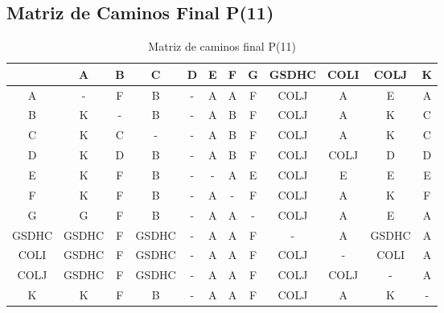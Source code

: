 \documentclass[12pt]{article}
\begin{document}
\subsection{Matriz de Caminos Final P(11)}
\begin{table}[h!]
\centering
\begin{tabular}{|c|c|c|c|c|c|c|c|c|c|c|c|}
\hline
 & A & B & C & D & E & F & G & GSDHC & COLI & COLJ & K \\\hline
A & - & F & B & - & A & A & F & COLJ & A & E & A \\\hline
B & K & - & B & - & A & B & F & COLJ & A & K & C \\\hline
C & K & C & - & - & A & B & F & COLJ & A & K & C \\\hline
D & K & D & B & - & A & B & F & COLJ & COLJ & D & D \\\hline
E & K & F & B & - & - & A & E & COLJ & E & E & E \\\hline
F & K & F & B & - & A & - & F & COLJ & A & K & F \\\hline
G & G & F & B & - & A & A & - & COLJ & A & E & A \\\hline
GSDHC & GSDHC & F & GSDHC & - & A & A & F & - & A & GSDHC & A \\\hline
COLI & GSDHC & F & GSDHC & - & A & A & F & COLJ & - & COLI & A \\\hline
COLJ & GSDHC & F & GSDHC & - & A & A & F & COLJ & COLJ & - & A \\\hline
K & K & F & B & - & A & A & F & COLJ & A & K & - \\\hline
\end{tabular}
\caption{Matriz de caminos final P(11)}
\end{table}

\clearpage
\end{document}

